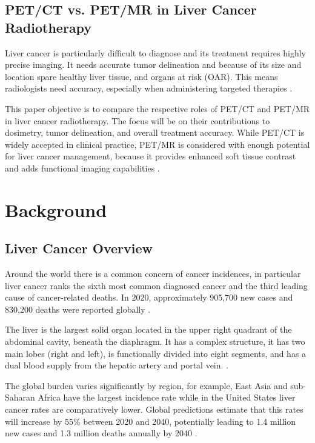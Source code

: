 \documentclass[11pt]{article} %
\begin{document}
\begin{multicols}{2}

\subsection{PET/CT vs. PET/MR in Liver Cancer Radiotherapy}
Liver cancer is particularly difficult to diagnose and its treatment requires highly precise imaging. It needs accurate tumor delineation and because of its size and location spare healthy liver tissue, and organs at risk (OAR). This means radiologists need accuracy, especially when administering targeted therapies \cite{beaton2019, floridi2022}.

This paper objective is to compare the respective roles of PET/CT and PET/MR in liver cancer radiotherapy. The focus will be on their contributions to dosimetry, tumor delineation, and overall treatment accuracy. While PET/CT is widely accepted in clinical practice, PET/MR is considered with enough potential for liver cancer management, because it provides enhanced soft tissue contrast and adds functional imaging capabilities \cite{decazes2021, yan2024}.

\section{Background}

\subsection{Liver Cancer Overview}
Around the world there is a common concern of cancer incidences, in particular liver cancer ranks the sixth most common diagnosed cancer and the third leading cause of cancer-related deaths. In 2020, approximately 905,700 new cases and 830,200 deaths were reported globally \cite{journal_of_hepatology2022}. 

The liver is the largest solid organ located in the upper right quadrant of the abdominal cavity, beneath the diaphragm. It has a complex structure,  it has two main lobes (right and left), is functionally divided into eight segments, and has a dual blood supply from the hepatic artery and portal vein. \cite{ozmen2020}.

The global burden varies significantly by region, for example, East Asia and sub-Saharan Africa have the largest incidence rate while in the United States liver cancer rates are comparatively lower. Global predictions estimate that this rates will increase by 55\% between 2020 and 2040, potentially leading to 1.4 million new cases and 1.3 million deaths annually by 2040 \cite{journal_of_hepatology2022}.


\end{multicols}
\end{document}
